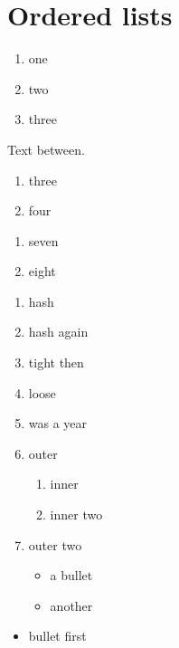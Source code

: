 \section{Ordered lists}\label{ordered-lists}

\begin{enumerate}
\def\labelenumi{\arabic{enumi}.}
\tightlist
\item
  one
\item
  two
\item
  three
\end{enumerate}

Text between.

\begin{enumerate}
\def\labelenumi{\arabic{enumi})}
\setcounter{enumi}{2}
\tightlist
\item
  three
\item
  four
\end{enumerate}

\begin{enumerate}
\def\labelenumi{(\arabic{enumi})}
\setcounter{enumi}{6}
\tightlist
\item
  seven
\item
  eight
\end{enumerate}

\begin{enumerate}
\item
  hash
\item
  hash again
\item
  tight then
\item
  loose
\item
  was a year
\item
  outer

  \begin{enumerate}
  \def\labelenumii{\arabic{enumii}.}
  \tightlist
  \item
    inner
  \item
    inner two
  \end{enumerate}
\item
  outer two

  \begin{itemize}
  \tightlist
  \item
    a bullet
  \item
    another
  \end{itemize}
\end{enumerate}

\begin{itemize}
\tightlist
\item
  bullet first
\end{itemize}

